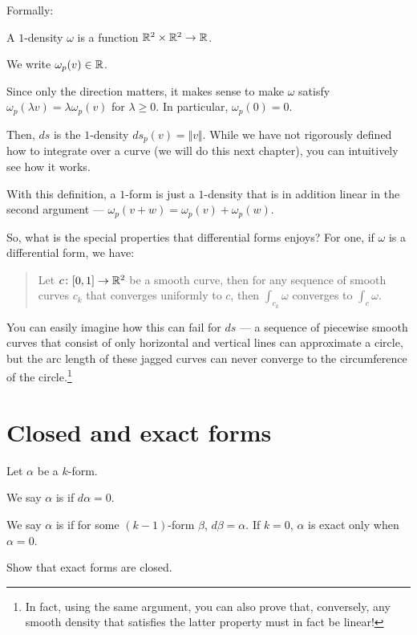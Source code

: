 Formally:
\begin{definition}[$1$-density]
	A $1$-density $\omega$ is a function $\mathbb R^2 \times \mathbb R^2 \to \mathbb R$.
\end{definition}
We write $\omega_p(v) \in \mathbb R$.

Since only the direction matters, it makes sense to make $\omega$ satisfy
$\omega_p(\lambda v) = \lambda \omega_p(v)$ for $\lambda \geq 0$.  In particular, $\omega_p(0) = 0$.

Then, $ds$ is the $1$-density $ds_p(v) = \Vert v \Vert$. While we have not rigorously defined
how to integrate over a curve (we will do this next chapter), you can intuitively see how it works.

With this definition, a $1$-form is just a $1$-density that is in addition linear in the second
argument --- $\omega_p(v + w) = \omega_p(v) + \omega_p(w)$.

So, what is the special properties that differential forms enjoys? For one, if $\omega$ is a
differential form, we have:
\begin{quote}
	Let $c \colon [0, 1] \to \mathbb R^2$ be a smooth curve, then for any sequence of smooth curves $c_k$
	that converges uniformly to $c$, then $\int_{c_k} \omega$ converges to $\int_c \omega$.
\end{quote}

You can easily imagine how this can fail for $ds$ --- a sequence of piecewise smooth curves
that consist of only horizontal and vertical lines can approximate a circle, but the arc length of
these jagged curves can never converge to the circumference of the circle.\footnote{In fact, using
the same argument, you can also prove that, conversely, any smooth density that satisfies the latter
property must in fact be linear!}

\section{Closed and exact forms}
Let $\alpha$ be a $k$-form.
\begin{definition}
	We say $\alpha$ is  if $d\alpha = 0$.
\end{definition}
\begin{definition}
	We say $\alpha$ is  if for some $(k-1)$-form $\beta$,
	$d\beta = \alpha$.  If $k = 0$, $\alpha$ is exact only when $\alpha = 0$.
\end{definition}
\begin{ques}
	Show that exact forms are closed.
\end{ques}

